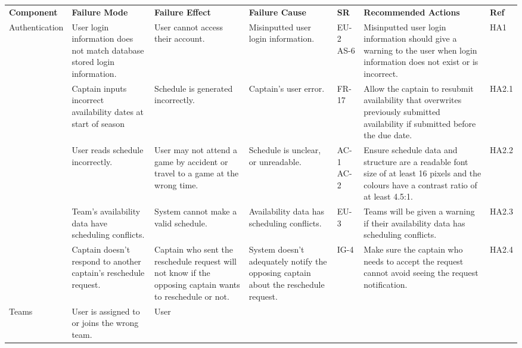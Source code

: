 \documentclass{article}
\begin{document}
\begin{landscape}
\begin{table}[ht]
\def\arraystretch{1.2}
\begin{tabularx}{504pt}{|p{3cm}||p{4cm}|p{4cm}|p{4cm}|p{1cm}|p{5.75cm}|p{1cm}|}
\cline{1-7}
\textbf{Component} & \textbf{Failure Mode} & \textbf{Failure Effect} & \textbf{Failure Cause} & \textbf{SR} & \textbf{Recommended Actions} & \textbf{Ref} \\
\cline{1-7}
\multirow{2}{2cm}{Authentication} & User login information does not match database stored
login information. & User cannot access their account. & Misinputted user login information.
& EU-2 AS-6 & Misinputted user login information should give a warning to the user when
login information does not exist or is incorrect. & HA1\\
\cline{1-7}
\multirow{2}{2cm}{Scheduling} & Captain inputs incorrect availability dates at
start of season & Schedule is generated incorrectly. & Captain's user error. &
FR-17 & Allow the captain to resubmit availability that overwrites previously
submitted availability if submitted before the due date. & HA2.1\\
\cline{2-7}
& User reads schedule incorrectly. & User may not attend a game by accident or
travel to a game at the wrong time. & Schedule is unclear, or unreadable. & AC-1 AC-2 & Ensure schedule data and structure are a readable
font size of at least 16 pixels and the colours have a contrast ratio of at least
4.5:1. & HA2.2\\
\cline{2-7}
& Team's availability data have scheduling conflicts. & System cannot make a
valid schedule. & Availability data has scheduling conflicts. & EU-3 & Teams
will be given a warning if their availability data has scheduling conflicts. & HA2.3\\
\cline{2-7}
& Captain doesn't respond to another captain's reschedule request. & Captain
who sent the reschedule request will not know if the opposing captain wants to
reschedule or not. & System doesn't adequately notify the opposing captain
about the reschedule request. & IG-4 & Make sure the captain who needs to
accept the request cannot avoid seeing the request notification. & HA2.4\\
\cline{1-7}
\multirow{2}{2cm}{Teams} & User is assigned to or joins the wrong team. & User

\end{tabularx}
\end{table}
\end{landscape}
\end{document}
